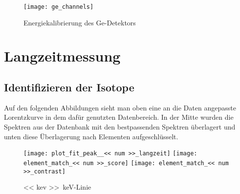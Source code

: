 \documentclass[11pt, ngerman, fleqn, DIV=15, headinclude, BCOR=2cm]{scrreprt}
\newcommand{\plotwidth}{0.8\linewidth}
\begin{document}
\begin{appendix}
\begin{figure}[htbp]
    \centering
    \texttt{[image: ge\_channels]}
    \caption{%
	    Energiekalibrierung des Ge-Detektors
    }
    \label{fig:ge_kanal}
\end{figure}



\clearpage

\chapter{Langzeitmessung}

\section{Identifizieren der Isotope}\label{anhang-bodenprobe}
Auf den folgenden Abbildungen sieht man oben eine an die Daten angepasste
Lorentzkurve in dem dafür genutzten Datenbereich. In der Mitte wurden die
Spektren aus der Datenbank mit den bestpassenden Spektren überlagert und unten
diese Überlagerung nach Elementen aufgeschlüsselt.


\begin{figure}
    \centering
    \texttt{[image: plot\_fit\_peak\_\_<< num >>\_langzeit]}
    \texttt{[image: element\_match\_<< num >>\_score]}
    \texttt{[image: element\_match\_<< num >>\_contrast]}
    \caption{%
        \SI{<< kev >>}{\kilo\electronvolt}-Linie
    }
    \label{fig:}
\end{figure}

\end{appendix}
\end{document}
